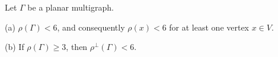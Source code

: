 Let $\Gamma$ be a planar multigraph.

(a) $\rho(\Gamma) < 6$, and consequently $\rho(x) < 6$ for at least one vertex $x \in V$.

(b) If $\rho(\Gamma) \geq 3$, then $\rho^{\perp}(\Gamma) < 6$.
